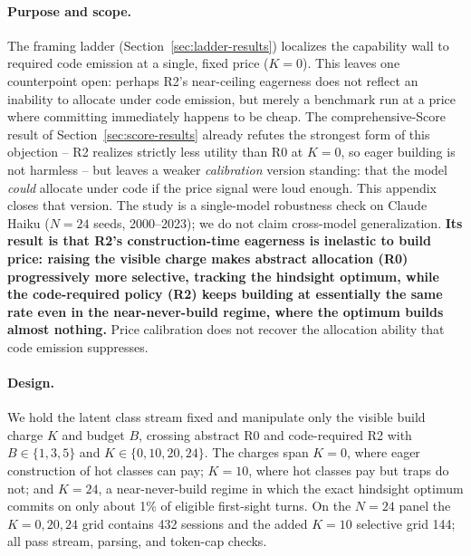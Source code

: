 \documentclass{article}
\begin{document}
\paragraph{Purpose and scope.} The framing ladder (Section~\ref{sec:ladder-results}) localizes the capability wall to required code emission at a single, fixed price ($K=0$). This leaves one counterpoint open: perhaps R2's near-ceiling eagerness does not reflect an inability to allocate under code emission, but merely a benchmark run at a price where committing immediately happens to be cheap. The comprehensive-Score result of Section~\ref{sec:score-results} already refutes the strongest form of this objection -- R2 realizes strictly less utility than R0 at $K=0$, so eager building is not harmless -- but leaves a weaker \emph{calibration} version standing: that the model \emph{could} allocate under code if the price signal were loud enough. This appendix closes that version. The study is a single-model robustness check on Claude Haiku ($N=24$ seeds, 2000--2023); we do not claim cross-model generalization. \textbf{Its result is that R2's construction-time eagerness is inelastic to build price: raising the visible charge makes abstract allocation (R0) progressively more selective, tracking the hindsight optimum, while the code-required policy (R2) keeps building at essentially the same rate even in the near-never-build regime, where the optimum builds almost nothing.} Price calibration does not recover the allocation ability that code emission suppresses.

\paragraph{Design.} We hold the latent class stream fixed and manipulate only the visible build charge $K$ and budget $B$, crossing abstract R0 and code-required R2 with $B\in\{1,3,5\}$ and $K\in\{0,10,20,24\}$. The charges span $K=0$, where eager construction of hot classes can pay; $K=10$, where hot classes pay but traps do not; and $K=24$, a near-never-build regime in which the exact hindsight optimum commits on only about 1\% of eligible first-sight turns. On the $N=24$ panel the $K=0,20,24$ grid contains 432 sessions and the added $K=10$ selective grid 144; all pass stream, parsing, and token-cap checks.
\end{document}
